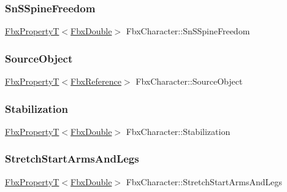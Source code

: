 \subsubsection{\texorpdfstring{Sn\+S\+Spine\+Freedom}{SnSSpineFreedom}}
{\footnotesize\ttfamily \hyperlink{class_fbx_property_t}{Fbx\+PropertyT}$<$\hyperlink{fbxtypes_8h_a171e72a1c46fc15c1a6c9c31948c1c5b}{Fbx\+Double}$>$ Fbx\+Character\+::\+Sn\+S\+Spine\+Freedom}

\mbox{\label{class_fbx_character_ac795fa45cdd1130e47667fa534510050}} 
\subsubsection{\texorpdfstring{Source\+Object}{SourceObject}}
{\footnotesize\ttfamily \hyperlink{class_fbx_property_t}{Fbx\+PropertyT}$<$\hyperlink{fbxtypes_8h_a44df6a2eec915cf27cd481e5c5e48a24}{Fbx\+Reference}$>$ Fbx\+Character\+::\+Source\+Object}

\mbox{\label{class_fbx_character_a52d730a256495edf5b99b323f40cfcfe}} 
\subsubsection{\texorpdfstring{Stabilization}{Stabilization}}
{\footnotesize\ttfamily \hyperlink{class_fbx_property_t}{Fbx\+PropertyT}$<$\hyperlink{fbxtypes_8h_a171e72a1c46fc15c1a6c9c31948c1c5b}{Fbx\+Double}$>$ Fbx\+Character\+::\+Stabilization}

\mbox{\label{class_fbx_character_a988aa7c18fa2e1f1f0fbd9f7a75da84d}} 
\subsubsection{\texorpdfstring{Stretch\+Start\+Arms\+And\+Legs}{StretchStartArmsAndLegs}}
{\footnotesize\ttfamily \hyperlink{class_fbx_property_t}{Fbx\+PropertyT}$<$\hyperlink{fbxtypes_8h_a171e72a1c46fc15c1a6c9c31948c1c5b}{Fbx\+Double}$>$ Fbx\+Character\+::\+Stretch\+Start\+Arms\+And\+Legs}

